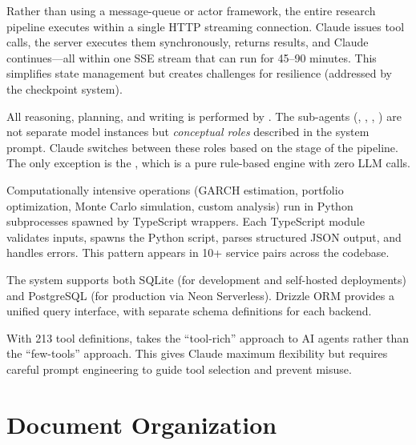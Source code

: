 \begin{description}[style=nextline]
  \item[Monolithic streaming loop.] Rather than using a message-queue or actor framework, the entire research pipeline executes within a single HTTP streaming connection.
  Claude issues tool calls, the server executes them synchronously, returns results, and Claude continues---all within one SSE stream that can run for 45--90 minutes.
  This simplifies state management but creates challenges for resilience (addressed by the checkpoint system).

  \item[Claude as the cognitive core.] All reasoning, planning, and writing is performed by \claude.
  The sub-agents (\gauss, \turing, \newton, \fisher) are not separate model instances but \emph{conceptual roles} described in the system prompt.
  Claude switches between these roles based on the stage of the pipeline.
  The only exception is the \governor, which is a pure rule-based engine with zero LLM calls.

  \item[TypeScript--Python bridge pattern.] Computationally intensive operations (GARCH estimation, portfolio optimization, Monte Carlo simulation, custom analysis) run in Python subprocesses spawned by TypeScript wrappers.
  Each TypeScript module validates inputs, spawns the Python script, parses structured JSON output, and handles errors.
  This pattern appears in 10+ service pairs across the codebase.

  \item[Dual database support.] The system supports both SQLite (for development and self-hosted deployments) and PostgreSQL (for production via Neon Serverless).
  Drizzle ORM provides a unified query interface, with separate schema definitions for each backend.

  \item[Tool-rich agent paradigm.] With 213 tool definitions, \autoscholar takes the ``tool-rich'' approach to AI agents rather than the ``few-tools'' approach.
  This gives Claude maximum flexibility but requires careful prompt engineering to guide tool selection and prevent misuse.
\end{description}

\section{Document Organization}
\label{sec:overview:organization}

